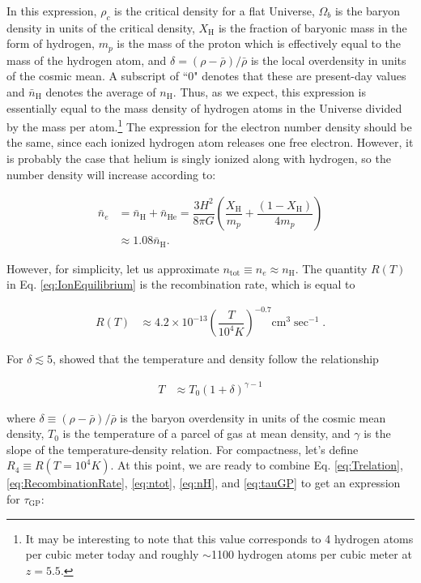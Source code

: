 In this expression, $\rho_c$ is the critical density for a flat Universe, $\Omega_{b}$ is the baryon density in units of the critical density, $X_{\text{H}}$ is the fraction of baryonic mass in the form of hydrogen, $m_{p}$ is the mass of the proton which is effectively equal to the mass of the hydrogen atom, and $\delta = (\rho-\bar{\rho})/\bar{\rho}$ is the local overdensity in units of the cosmic mean. A subscript of ``0" denotes that these are present-day values and $\bar{n}_{\text{H}}$ denotes the average of $n_{\text{H}}$. Thus, as we expect, this expression is essentially equal to the mass density of hydrogen atoms in the Universe divided by the mass per atom.\footnote{It may be interesting to note that this value corresponds to 4 hydrogen atoms per cubic meter today and roughly $\sim$1100 hydrogen atoms per cubic meter at $z = 5.5$.}  The expression for the electron number density should be the same, since each ionized hydrogen atom releases one free electron. However, it is probably the case that helium is singly ionized along with hydrogen, so the number density will increase according to:

\begin{align}
\bar{n}_e &= \bar{n}_{\text{H}} + \bar{n}_{\text{He}} = \dfrac{3H^2}{8\pi G}\left( \dfrac{X_{\text{H}}}{m_{p}} + \dfrac{(1 - X_{\text{H}})}{4m_{p}} \right) \\
&\approx 1.08 \bar{n}_{\text{H}}. 
\end{align}

However, for simplicity, let us approximate $n_{\text{tot}} \equiv n_{e} \approx n_{\text{H}}$. The quantity $R(T)$ in Eq. \ref{eq:IonEquilibrium} is the recombination rate, which is equal to

\begin{align}
R(T) &\approx 4.2 \times 10^{-13}\left( \dfrac{T}{10^{4} K}\right)^{-0.7} \text{cm}^{3}\sec^{-1}. \label{eq:RecombinationRate}
\end{align}

For $\delta \lesssim 5$, \cite{Hui1997} showed that the temperature and density follow the relationship

\begin{align}
T &\approx T_{0}(1+\delta)^{\gamma - 1} \label{eq:Trelation}
\end{align}

where $\delta \equiv (\rho - \bar{\rho})/\bar{\rho}$ is the baryon overdensity in units of the cosmic mean density, $T_0$ is the temperature of a parcel of gas at mean density, and $\gamma$ is the slope of the temperature-density relation. For compactness, let's define $R_{4} \equiv R(T=10^{4}K)$. At this point, we are ready to combine Eq. \ref{eq:Trelation}, \ref{eq:RecombinationRate}, \ref{eq:ntot}, \ref{eq:nH}, and \ref{eq:tauGP} to get an expression for $\tau_{\text{GP}}$:

